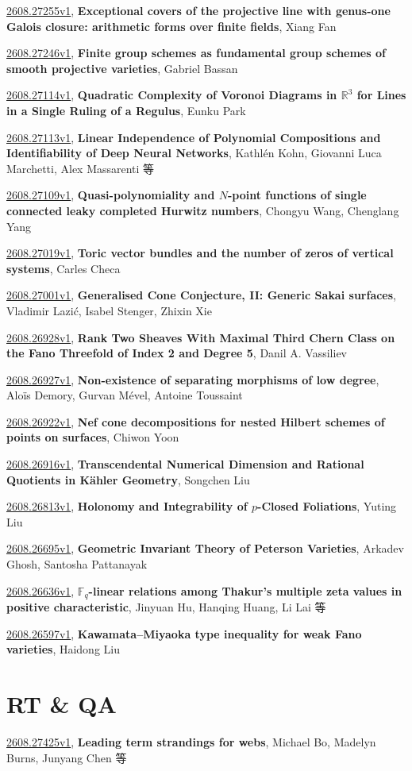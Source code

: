 \documentclass[9pt, a4paper]{article}
\theoremstyle{plain}
\theoremstyle{definition}
\theoremstyle{remark}
\newcommand{\arxiv}[3]{\href{https://arxiv.org/abs/#1}{#1}, \textbf{\textcolor{arxivblue}{#2}}, #3}
\begin{document}
\arxiv{2608.27255v1}{Exceptional covers of the projective line with genus-one Galois closure: arithmetic forms over finite fields}{Xiang Fan}

\arxiv{2608.27246v1}{Finite group schemes as fundamental group schemes of smooth projective varieties}{Gabriel Bassan}

\arxiv{2608.27114v1}{Quadratic Complexity of Voronoi Diagrams in $\mathbb{R}^3$ for Lines in a Single Ruling of a Regulus}{Eunku Park}

\arxiv{2608.27113v1}{Linear Independence of Polynomial Compositions and Identifiability of Deep Neural Networks}{Kathlén Kohn, Giovanni Luca Marchetti, Alex Massarenti 等}

\arxiv{2608.27109v1}{Quasi-polynomiality and $N$-point functions of single connected leaky completed Hurwitz numbers}{Chongyu Wang, Chenglang Yang}

\arxiv{2608.27019v1}{Toric vector bundles and the number of zeros of vertical systems}{Carles Checa}

\arxiv{2608.27001v1}{Generalised Cone Conjecture, II: Generic Sakai surfaces}{Vladimir Lazić, Isabel Stenger, Zhixin Xie}

\arxiv{2608.26928v1}{Rank Two Sheaves With Maximal Third Chern Class on the Fano Threefold of Index 2 and Degree 5}{Danil A. Vassiliev}

\arxiv{2608.26927v1}{Non-existence of separating morphisms of low degree}{Aloïs Demory, Gurvan Mével, Antoine Toussaint}

\arxiv{2608.26922v1}{Nef cone decompositions for nested Hilbert schemes of points on surfaces}{Chiwon Yoon}

\arxiv{2608.26916v1}{Transcendental Numerical Dimension and Rational Quotients in Kähler Geometry}{Songchen Liu}

\arxiv{2608.26813v1}{Holonomy and Integrability of $p$-Closed Foliations}{Yuting Liu}

\arxiv{2608.26695v1}{Geometric Invariant Theory of Peterson Varieties}{Arkadev Ghosh, Santosha Pattanayak}

\arxiv{2608.26636v1}{$\mathbb{F}_q$-linear relations among Thakur's multiple zeta values in positive characteristic}{Jinyuan Hu, Hanqing Huang, Li Lai 等}

\arxiv{2608.26597v1}{Kawamata--Miyaoka type inequality for weak Fano varieties}{Haidong Liu}


\section{RT \& QA}
\arxiv{2608.27425v1}{Leading term strandings for webs}{Michael Bo, Madelyn Burns, Junyang Chen 等}
\end{document}
